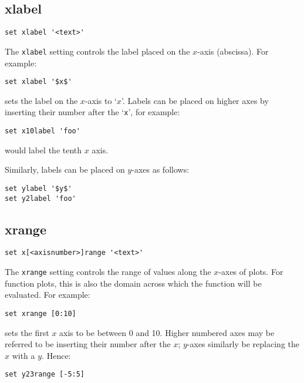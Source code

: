 \subsection{xlabel}

\begin{verbatim}
set xlabel '<text>'
\end{verbatim}

The {\tt xlabel} setting controls the label placed on the $x$-axis (abscissa).
For example:

\begin{verbatim}
set xlabel '$x$'
\end{verbatim}

\noindent sets the label on the $x$-axis to `$x$'.  Labels can be placed on higher axes by
inserting their number after the `{\tt x}', for example:

\begin{verbatim}
set x10label 'foo'
\end{verbatim}

\noindent would label the tenth $x$ axis.

Similarly, labels can be placed on $y$-axes as follows:

\begin{verbatim}
set ylabel '$y$' 
set y2label 'foo'
\end{verbatim}


\subsection{xrange}

\begin{verbatim}
set x[<axisnumber>]range '<text>'
\end{verbatim}

The {\tt xrange} setting controls the range of values along the $x$-axes of
plots.  For function plots, this is also the domain across which the function
will be evaluated.  For example:

\begin{verbatim}
set xrange [0:10]
\end{verbatim}

\noindent sets the first $x$ axis to be between 0 and 10.  Higher numbered axes may be
referred to be inserting their number after the $x$; $y$-axes similarly be
replacing the $x$ with a $y$.  Hence:

\begin{verbatim}
set y23range [-5:5]
\end{verbatim}

